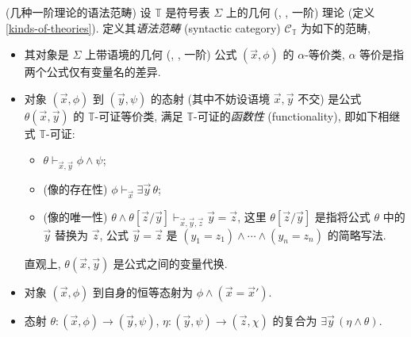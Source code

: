 \begin{definition}
	[label={first-order-theory-syntactic-category}]
	{(几种一阶理论的语法范畴)}
	设 $\mathbb T$ 是符号表 $\Sigma$ 上的几何 (\regular{}, \coherent{}, 一阶) 理论 (定义 \ref{kinds-of-theories}). 定义其\emph{语法范畴} (syntactic category) $\mathcal C_{\mathbb T}$ 为如下的范畴,
	\begin{itemize}
		\item 其对象是 $\Sigma$ 上带语境的几何 (\regular{}, \coherent{}, 一阶) 公式 $(\vec x , \phi)$ 的 $\alpha$-等价类, $\alpha$ 等价是指两个公式仅有变量名的差异.
		\item 对象 $(\vec x , \phi)$ 到 $(\vec y , \psi)$ 的态射 (其中不妨设语境 $\vec x , \vec y$ 不交) 是公式 $\theta(\vec x,\vec y)$ 的 $\mathbb T$-可证等价类, 满足 $\mathbb T$-可证的\emph{函数性} (functionality), 即如下相继式 $\mathbb T$-可证:
		\begin{itemize}
			\item $\theta\vdash_{\vec x,\vec y} \phi \wedge \psi$;
			\item (像的存在性) $\phi\vdash_{\vec x} \exists \vec y \,\theta$;
			\item (像的唯一性) $\theta \wedge \theta[\vec z/\vec y] \vdash_{\vec x,\vec y,\vec z} \vec y = \vec z$, 这里 $\theta[\vec z / \vec y]$ 是指将公式 $\theta$ 中的 $\vec y$ 替换为 $\vec z$, 公式 $\vec y = \vec z$ 是 $(y_1=z_1)\land \cdots\land (y_n=z_n)$ 的简略写法.
		\end{itemize}
		直观上, $\theta(\vec x,\vec y)$ 是公式之间的变量代换.
		\item 对象 $(\vec x,\phi)$ 到自身的恒等态射为 $\phi\land (\vec x = \vec x')$.
		\item 态射 $\theta\colon (\vec x,\phi) \to (\vec y,\psi)$, $\eta\colon (\vec y,\psi) \to (\vec z,\chi)$ 的复合为
		$
		\exists\vec y\,(\eta\land\theta)
		$.
	\end{itemize}
\end{definition}

